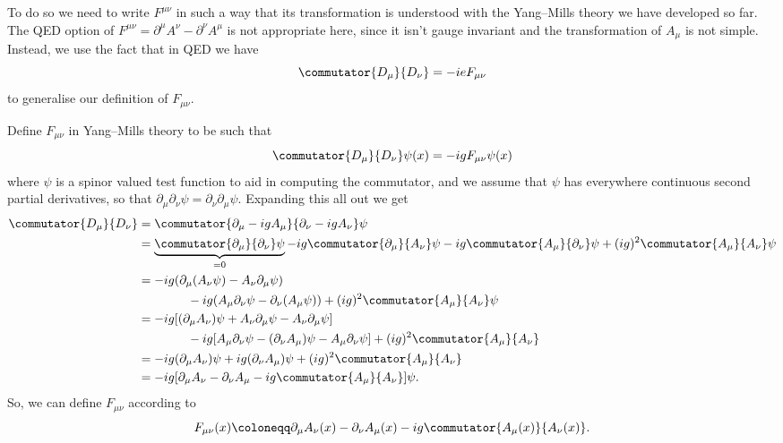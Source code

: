 \documentclass[fleqn]{NotesClass}
\newcommand{\covariantDerivative}{D}
\begin{document}
    To do so we need to write \(F^{\mu\nu}\) in such a way that its transformation is understood with the Yang--Mills theory we have developed so far.
    The QED option of \(F^{\mu\nu} = \partial^\mu A^\nu - \partial^\nu A^\mu\) is not appropriate here, since it isn't gauge invariant and the transformation of \(A_\mu\) is not simple.
    Instead, we use the fact that in QED we have
    \begin{equation}
        \commutator{\covariantDerivative_\mu}{\covariantDerivative_\nu} = -ieF_{\mu\nu}
    \end{equation}
    to generalise our definition of \(F_{\mu\nu}\).
    
    Define \(F_{\mu\nu}\) in Yang--Mills theory to be such that
    \begin{equation}
        \commutator{\covariantDerivative_\mu}{\covariantDerivative_\nu}\psi(x) = -igF_{\mu\nu}\psi(x)
    \end{equation}
    where \(\psi\) is a spinor valued test function to aid in computing the commutator, and we assume that \(\psi\) has everywhere continuous second partial derivatives, so that \(\partial_\mu \partial_\nu \psi = \partial_\nu \partial_\mu \psi\).
    Expanding this all out we get
    \begin{align}
        \commutator{\covariantDerivative_\mu}{\covariantDerivative_\nu} &= \commutator{\partial_\mu - igA_\mu}{\partial_\nu - igA_\nu}\psi\\
        &= \underbrace{\commutator{\partial_\mu}{\partial_\nu}\psi}_{= 0} - ig\commutator{\partial_\mu}{A_\nu}\psi - ig\commutator{A_\mu}{\partial_\nu}\psi + (ig)^2\commutator{A_\mu}{A_\nu}\psi\\
        &= -ig(\partial_\mu(A_\nu \psi) - A_\nu\partial_\mu\psi) \notag\\
        &\qquad\qquad - ig(A_\mu\partial_\nu\psi - \partial_\nu(A_\mu\psi)) + (ig)^2\commutator{A_\mu}{A_\nu}\psi\\
        &= -ig[(\partial_\mu A_\nu)\psi + A_\nu\partial_\mu\psi - A_\nu\partial_\mu\psi] \notag\\
        &\qquad\qquad- ig[A_\mu\partial_\nu\psi - (\partial_\nu A_\mu)\psi - A_\mu\partial_\nu\psi] + (ig)^2\commutator{A_\mu}{A_\nu}\\
        &= -ig(\partial_\mu A_\nu)\psi + ig(\partial_\nu A_\mu)\psi + (ig)^2\commutator{A_\mu}{A_\nu}\\
        &= -ig[\partial_\mu A_\nu - \partial_\nu A_\mu - ig\commutator{A_\mu}{A_\nu}]\psi.
    \end{align}
    So, we can define \(F_{\mu\nu}\) according to
    \begin{equation}
        F_{\mu\nu}(x) \coloneqq \partial_\mu A_\nu(x) - \partial_\nu A_\mu(x) - ig\commutator{A_\mu(x)}{A_\nu(x)}.
    \end{equation}
    
\end{document}
